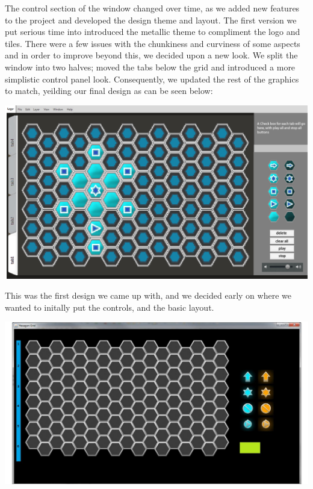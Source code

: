 \documentclass[10pt,a4paper]{article}
\begin{document}
The control section of the window changed over time, as we added new features to the project and developed the design theme and layout. The first version we put serious time into introduced the metallic theme to compliment the logo and tiles. There were a few issues with the chunkiness and curviness of some aspects and in order to improve beyond this, we decided upon a new look. We split the window into two halves; moved the tabs below the grid and introduced a more simplistic control panel look. Consequently, we updated the rest of the graphics to match, yeilding our final design as can be seen below:\\
\begin{center}
\includegraphics[scale=0.45]{logoprogression1.png}
\end{center}

This was the first design we came up with, and we decided early on where we wanted to initally put the controls, and the basic layout.
\\
\begin{center}
\includegraphics[scale=0.45]{logoprogression2.png}
\end{center}
\end{document}
